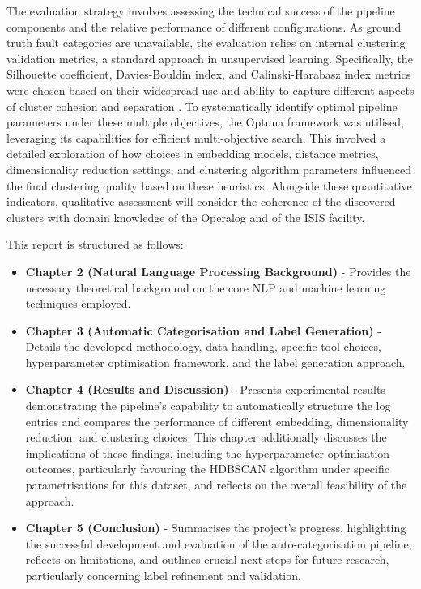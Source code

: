 \documentclass[10pt,oneside]{report}
\begin{document}
The evaluation strategy involves assessing the technical success of the pipeline components and the relative performance of different configurations. As ground truth fault categories are unavailable, the evaluation relies on internal clustering validation metrics, a standard approach in unsupervised learning. Specifically, the Silhouette coefficient, Davies-Bouldin index, and Calinski-Harabasz index metrics were chosen based on their widespread use and ability to capture different aspects of cluster cohesion and separation \cite{rousseeuw1987silhouettes, davies1979cluster, calinski1974dendrite}. To systematically identify optimal pipeline parameters under these multiple objectives, the Optuna framework \cite{akiba2019optuna} was utilised, leveraging its capabilities for efficient multi-objective search.
This involved a detailed exploration of how choices in embedding models, distance metrics, dimensionality reduction settings, and clustering algorithm parameters influenced the final clustering quality based on these heuristics. Alongside these quantitative indicators, qualitative assessment will consider the coherence of the discovered clusters with domain knowledge of the Operalog and of the ISIS facility.


This report is structured as follows:

\begin{itemize}
    \item \textbf{Chapter 2 (Natural Language Processing Background)} - Provides the necessary theoretical background on the core NLP and machine learning techniques employed.
    \item \textbf{Chapter 3 (Automatic Categorisation and Label Generation)} - Details the developed methodology, data handling, specific tool choices, hyperparameter optimisation framework, and the label generation approach.
    \item \textbf{Chapter 4 (Results and Discussion)} - Presents experimental results demonstrating the pipeline's capability to automatically structure the log entries and compares the performance of different embedding, dimensionality reduction, and clustering choices. This chapter additionally discusses the implications of these findings, including the hyperparameter optimisation outcomes, particularly favouring the HDBSCAN algorithm \cite{campello2013density} under specific parametrisations for this dataset, and reflects on the overall feasibility of the approach.
    \item \textbf{Chapter 5 (Conclusion)} - Summarises the project's progress, highlighting the successful development and evaluation of the auto-categorisation pipeline, reflects on limitations, and outlines crucial next steps for future research, particularly concerning label refinement and validation.
\end{itemize}
\end{document}
